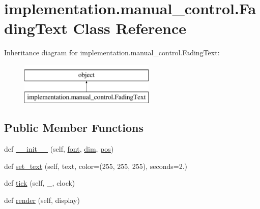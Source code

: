 \hypertarget{classimplementation_1_1manual__control_1_1_fading_text}{}\section{implementation.\+manual\+\_\+control.\+Fading\+Text Class Reference}
\label{classimplementation_1_1manual__control_1_1_fading_text}
Inheritance diagram for implementation.\+manual\+\_\+control.\+Fading\+Text\+:\begin{figure}[H]
\begin{center}
\leavevmode
\includegraphics[height=2.000000cm]{classimplementation_1_1manual__control_1_1_fading_text}
\end{center}
\end{figure}
\subsection*{Public Member Functions}
\begin{DoxyCompactItemize}
\item 
def \hyperlink{classimplementation_1_1manual__control_1_1_fading_text_a53de3cc3e5cf3e7f33e0d8e58dcf5a65}{\+\_\+\+\_\+init\+\_\+\+\_\+} (self, \hyperlink{classimplementation_1_1manual__control_1_1_fading_text_a082fb4699489a87bdbacb57c98c12b03}{font}, \hyperlink{classimplementation_1_1manual__control_1_1_fading_text_a0f27882c9976418cb316d18dfb6fdfa0}{dim}, \hyperlink{classimplementation_1_1manual__control_1_1_fading_text_a37bc572c9faf6b8d5803e5a52bda25b7}{pos})
\item 
def \hyperlink{classimplementation_1_1manual__control_1_1_fading_text_a8c4b42f518a578286bacb5bc0f8988ae}{set\+\_\+text} (self, text, color=(255, 255, 255), seconds=2.)
\item 
def \hyperlink{classimplementation_1_1manual__control_1_1_fading_text_a1b6d98594b0a590e8333ab2dd6523d09}{tick} (self, \+\_\+, clock)
\item 
def \hyperlink{classimplementation_1_1manual__control_1_1_fading_text_ac40469e99420d5e9c62a1dbcce7f4c01}{render} (self, display)
\end{DoxyCompactItemize}
